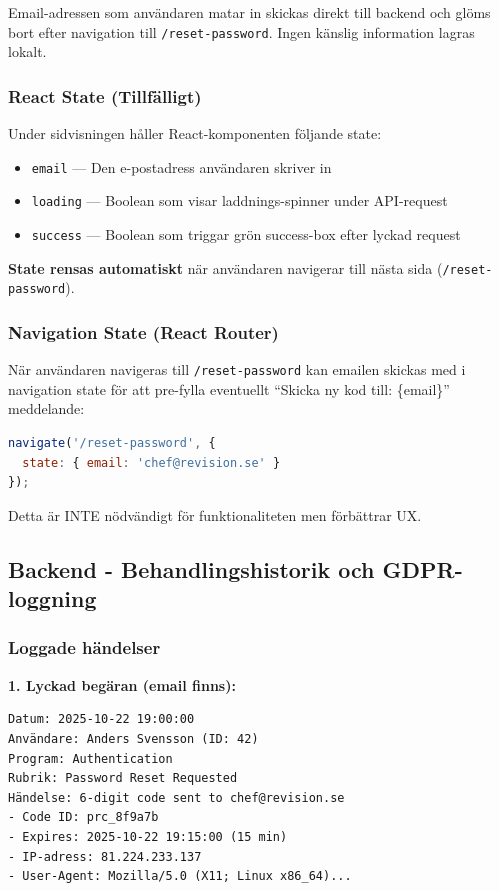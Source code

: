 \documentclass[12pt,a4paper]{article}
\begin{document}
Email-adressen som användaren matar in skickas direkt till backend och glöms bort efter navigation till \texttt{/reset-password}. Ingen känslig information lagras lokalt.

\subsubsection{React State (Tillfälligt)}
Under sidvisningen håller React-komponenten följande state:
\begin{itemize}[noitemsep]
  \item \texttt{email} — Den e-postadress användaren skriver in
  \item \texttt{loading} — Boolean som visar laddnings-spinner under API-request
  \item \texttt{success} — Boolean som triggar grön success-box efter lyckad request
\end{itemize}

\textbf{State rensas automatiskt} när användaren navigerar till nästa sida (\texttt{/reset-password}).

\subsubsection{Navigation State (React Router)}
När användaren navigeras till \texttt{/reset-password} kan emailen skickas med i navigation state för att pre-fylla eventuellt ``Skicka ny kod till: \{email\}'' meddelande:

\begin{lstlisting}[language=javascript]
navigate('/reset-password', { 
  state: { email: 'chef@revision.se' } 
});
\end{lstlisting}

Detta är INTE nödvändigt för funktionaliteten men förbättrar UX.

\subsection{Backend - Behandlingshistorik och GDPR-loggning}

\subsubsection{Loggade händelser}

\textbf{1. Lyckad begäran (email finns):}
\begin{verbatim}
Datum: 2025-10-22 19:00:00
Användare: Anders Svensson (ID: 42)
Program: Authentication
Rubrik: Password Reset Requested
Händelse: 6-digit code sent to chef@revision.se
- Code ID: prc_8f9a7b
- Expires: 2025-10-22 19:15:00 (15 min)
- IP-adress: 81.224.233.137
- User-Agent: Mozilla/5.0 (X11; Linux x86_64)...
\end{verbatim}
\end{document}
